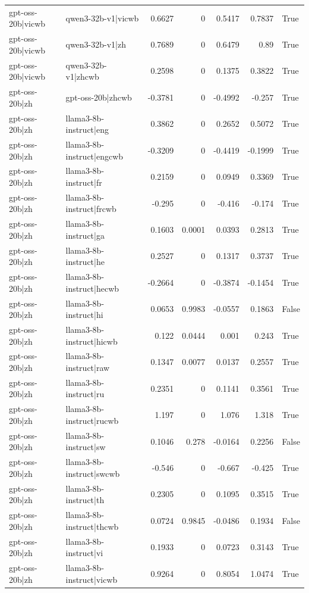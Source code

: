 \begin{table}
\begin{tabular}{l l r r r r l}
gpt-oss-20b|vicwb & qwen3-32b-v1|vicwb & 0.6627 & 0 & 0.5417 & 0.7837 & True \\
gpt-oss-20b|vicwb & qwen3-32b-v1|zh & 0.7689 & 0 & 0.6479 & 0.89 & True \\
gpt-oss-20b|vicwb & qwen3-32b-v1|zhcwb & 0.2598 & 0 & 0.1375 & 0.3822 & True \\
gpt-oss-20b|zh & gpt-oss-20b|zhcwb & -0.3781 & 0 & -0.4992 & -0.257 & True \\
gpt-oss-20b|zh & llama3-8b-instruct|eng & 0.3862 & 0 & 0.2652 & 0.5072 & True \\
gpt-oss-20b|zh & llama3-8b-instruct|engcwb & -0.3209 & 0 & -0.4419 & -0.1999 & True \\
gpt-oss-20b|zh & llama3-8b-instruct|fr & 0.2159 & 0 & 0.0949 & 0.3369 & True \\
gpt-oss-20b|zh & llama3-8b-instruct|frcwb & -0.295 & 0 & -0.416 & -0.174 & True \\
gpt-oss-20b|zh & llama3-8b-instruct|ga & 0.1603 & 0.0001 & 0.0393 & 0.2813 & True \\
gpt-oss-20b|zh & llama3-8b-instruct|he & 0.2527 & 0 & 0.1317 & 0.3737 & True \\
gpt-oss-20b|zh & llama3-8b-instruct|hecwb & -0.2664 & 0 & -0.3874 & -0.1454 & True \\
gpt-oss-20b|zh & llama3-8b-instruct|hi & 0.0653 & 0.9983 & -0.0557 & 0.1863 & False \\
gpt-oss-20b|zh & llama3-8b-instruct|hicwb & 0.122 & 0.0444 & 0.001 & 0.243 & True \\
gpt-oss-20b|zh & llama3-8b-instruct|raw & 0.1347 & 0.0077 & 0.0137 & 0.2557 & True \\
gpt-oss-20b|zh & llama3-8b-instruct|ru & 0.2351 & 0 & 0.1141 & 0.3561 & True \\
gpt-oss-20b|zh & llama3-8b-instruct|rucwb & 1.197 & 0 & 1.076 & 1.318 & True \\
gpt-oss-20b|zh & llama3-8b-instruct|sw & 0.1046 & 0.278 & -0.0164 & 0.2256 & False \\
gpt-oss-20b|zh & llama3-8b-instruct|swcwb & -0.546 & 0 & -0.667 & -0.425 & True \\
gpt-oss-20b|zh & llama3-8b-instruct|th & 0.2305 & 0 & 0.1095 & 0.3515 & True \\
gpt-oss-20b|zh & llama3-8b-instruct|thcwb & 0.0724 & 0.9845 & -0.0486 & 0.1934 & False \\
gpt-oss-20b|zh & llama3-8b-instruct|vi & 0.1933 & 0 & 0.0723 & 0.3143 & True \\
gpt-oss-20b|zh & llama3-8b-instruct|vicwb & 0.9264 & 0 & 0.8054 & 1.0474 & True \\

\end{tabular}
\end{table}
